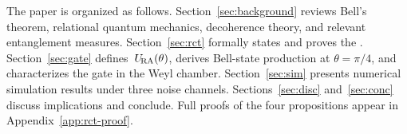 The paper is organized as follows.
Section~\ref{sec:background} reviews Bell's theorem, relational quantum
mechanics, decoherence theory, and relevant entanglement measures.
Section~\ref{sec:rct} formally states and proves the \RCT.
Section~\ref{sec:gate} defines~$U_{\!\mathrm{RA}}(\theta)$, derives Bell-state
production at $\theta = \pi/4$, and characterizes the gate in the Weyl
chamber.
Section~\ref{sec:sim} presents numerical simulation results under three noise
channels.
Sections~\ref{sec:disc} and~\ref{sec:conc} discuss implications and conclude.
Full proofs of the four propositions appear in Appendix~\ref{app:rct-proof}.
